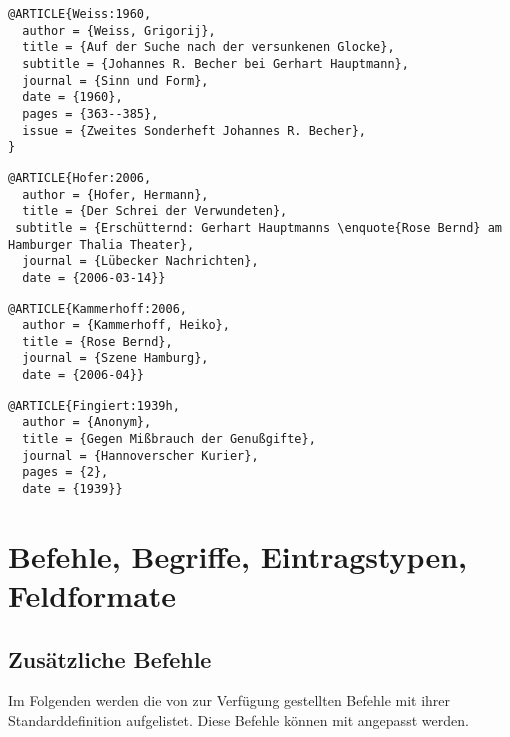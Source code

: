 \documentclass[ngerman]{scrartcl}
\begin{document}
\begin{lstlisting}
@ARTICLE{Weiss:1960,
  author = {Weiss, Grigorij},
  title = {Auf der Suche nach der versunkenen Glocke},
  subtitle = {Johannes R. Becher bei Gerhart Hauptmann},
  journal = {Sinn und Form},
  date = {1960},
  pages = {363--385},
  issue = {Zweites Sonderheft Johannes R. Becher},
}
\end{lstlisting}

\begin{lstlisting}
@ARTICLE{Hofer:2006,
  author = {Hofer, Hermann},
  title = {Der Schrei der Verwundeten},
 subtitle = {Erschütternd: Gerhart Hauptmanns \enquote{Rose Bernd} am Hamburger Thalia Theater},
  journal = {Lübecker Nachrichten},
  date = {2006-03-14}}
\end{lstlisting}

\begin{lstlisting}
@ARTICLE{Kammerhoff:2006,
  author = {Kammerhoff, Heiko},
  title = {Rose Bernd},
  journal = {Szene Hamburg},
  date = {2006-04}}
\end{lstlisting}

\begin{lstlisting}
@ARTICLE{Fingiert:1939h,
  author = {Anonym},
  title = {Gegen Mißbrauch der Genußgifte},
  journal = {Hannoverscher Kurier},
  pages = {2},
  date = {1939}}
\end{lstlisting}

\section{Befehle, Begriffe, Eintragstypen, Feldformate}
\subsection{Zusätzliche Befehle}
Im Folgenden werden die von \bldw{} zur Verfügung gestellten Befehle mit ihrer Standarddefinition aufgelistet. Diese Befehle können mit  angepasst werden.
\end{document}

